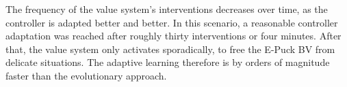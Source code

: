 \documentclass[a4paper]{jacow}
\begin{document}
The frequency of the value system's interventions decreases over time, as the controller is adapted better and better. In this scenario, a reasonable controller adaptation was reached after roughly thirty interventions or four minutes. After that, the value system only activates sporadically, to free the E-Puck BV from delicate situations. The adaptive learning therefore is by orders of magnitude faster than the evolutionary approach.
\end{document}
